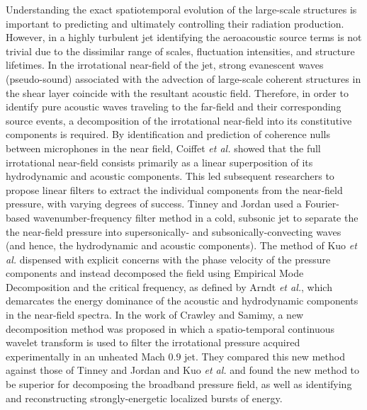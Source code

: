 \documentclass[english]{aiaa-tc}
\begin{document}
Understanding the exact spatiotemporal evolution of the large-scale structures is important to predicting and ultimately controlling their radiation production. However, in a highly turbulent jet identifying the aeroacoustic source terms is not trivial due to the dissimilar range of scales, fluctuation intensities, and structure lifetimes. In the irrotational near-field of the jet, strong evanescent waves (pseudo-sound) associated with the advection of large-scale coherent structures in the shear layer coincide with the resultant acoustic field. Therefore, in order to identify pure acoustic waves traveling to the far-field and their corresponding source events, a decomposition of the irrotational near-field into its constitutive components is required. By identification and prediction of coherence nulls between microphones in the near field, Coiffet {\em et al.}\cite{Coiffet2006} showed that the full irrotational near-field consists primarily as a linear superposition of its hydrodynamic and acoustic components. This led subsequent researchers to propose linear filters to extract the individual components from the near-field pressure, with varying degrees of success. 
 Tinney and Jordan\cite{Tinney2008} used a Fourier-based wavenumber-frequency filter method in a cold, subsonic jet to separate the the near-field pressure into supersonically- and subsonically-convecting waves (and hence, the hydrodynamic and acoustic components). The method of Kuo {\em et al.}\cite{Kuo2013} dispensed with explicit concerns with the phase velocity of the pressure components and instead decomposed the field using Empirical Mode Decomposition and the critical frequency, as defined by Arndt {\em et al.}\cite{Arndt1997}, which demarcates the energy dominance of the acoustic and hydrodynamic components in the near-field spectra. In the work of Crawley and Samimy\cite{crawley2014b}, a new decomposition method was proposed in which a spatio-temporal continuous wavelet transform is used to filter the irrotational pressure acquired experimentally in an unheated Mach $0.9$ jet. They compared this new method against those of Tinney and Jordan\cite{Tinney2008} and Kuo {\em et al.}\cite{Kuo2013} and found the new method to be superior for decomposing the broadband pressure field, as well as identifying and reconstructing strongly-energetic localized bursts of energy.  
\end{document}

